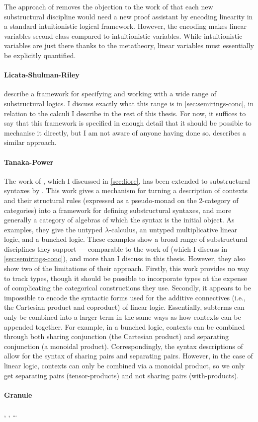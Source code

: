 The approach of \citet{crary10} removes the objection to the work of
\citet{CP02} that each new substructural discipline would need a new proof
assistant by encoding linearity in a standard intuitionistic logical framework.
However, the encoding makes linear variables second-class compared to
intuitionistic variables.
While intuitionistic variables are just there thanks to the metatheory, linear
variables must essentially be explicitly quantified.

\paragraph{Licata-Shulman-Riley}
 describe a framework for specifying and working with a wide
range of substructural logics.
I discuss exactly what this range is in \cref{sec:semirings-conc}, in relation
to the calculi I describe in the rest of this thesis.
For now, it suffices to say that this framework is specified in enough detail
that it should be possible to mechanise it directly, but I am not aware of
anyone having done so.
 describes a similar approach.

\paragraph{Tanaka-Power}
The work of \citet{FPT99}, which I discussed in \cref{sec:fiore}, has been
extended to substructural syntaxes by \citet{TP06}.
This work gives a mechanism for turning a description of contexts and their
structural rules (expressed as a pseudo-monad on the 2-category of categories)
into a framework for defining substructural syntaxes, and more generally a
category of algebras of which the syntax is the initial object.
As examples, they give the untyped $\lambda$-calculus, an untyped multiplicative
linear logic, and a bunched logic.
These examples show a broad range of substructural disciplines they support ---
comparable to the work of \citet{LicataSR17} (which I discuss in
\cref{sec:semirings-conc}), and more than I discuss in this thesis.
However, they also show two of the limitations of their approach.
Firstly, this work provides no way to track types, though it should be possible
to incorporate types at the expense of complicating the categorical
constructions they use.
Secondly, it appears to be impossible to encode the syntactic forms used for the
additive connectives (i.e., the Cartesian product and coproduct) of linear
logic.
Essentially, subterms can only be combined into a larger term in the same ways
as how contexts can be appended together.
For example, in a bunched logic, contexts can be combined through both sharing
conjunction (the Cartesian product) and separating conjunction
(a monoidal product).
Correspondingly, the syntax descriptions of \citeauthor{TP06} allow for the
syntax of sharing pairs and separating pairs.
However, in the case of linear logic, contexts can only be combined via a
monoidal product, so we only get separating pairs (tensor-products) and not
sharing pairs (with-products).

\paragraph{Granule}
\citet{BrunelGMZ14}, \citet{GhicaS14}, \ldots
